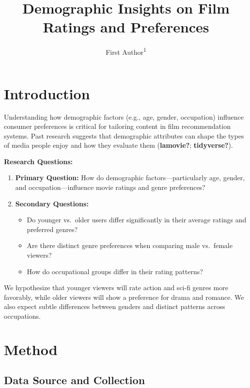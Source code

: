 \documentclass[
  man]{apa6}
\title{Demographic Insights on Film Ratings and Preferences}
\author{First Author\textsuperscript{1}}
\date{}
\affiliation{\vspace{0.5cm}\textsuperscript{1} Wilhelm-Wundt-University}
\providecommand{\tightlist}{%
  \setlength{\itemsep}{0pt}\setlength{\parskip}{0pt}}
\begin{document}
\maketitle

\section{Introduction}\label{introduction}

Understanding how demographic factors (e.g., age, gender, occupation) influence consumer preferences is critical for tailoring content in film recommendation systems. Past research suggests that demographic attributes can shape the types of media people enjoy and how they evaluate them (\textbf{lamovie?}; \textbf{tidyverse?}).

\textbf{Research Questions:}

\begin{enumerate}
\def\labelenumi{\arabic{enumi}.}
\item
  \textbf{Primary Question:} How do demographic factors---particularly age, gender, and occupation---influence movie ratings and genre preferences?
\item
  \textbf{Secondary Questions:}

  \begin{itemize}
  \tightlist
  \item
    Do younger vs.~older users differ significantly in their average ratings and preferred genres?
  \item
    Are there distinct genre preferences when comparing male vs.~female viewers?
  \item
    How do occupational groups differ in their rating patterns?
  \end{itemize}
\end{enumerate}

We hypothesize that younger viewers will rate action and sci-fi genres more favorably, while older viewers will show a preference for drama and romance. We also expect subtle differences between genders and distinct patterns across occupations.

\section{Method}\label{method}

\subsection{Data Source and Collection}\label{data-source-and-collection}
\end{document}
